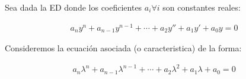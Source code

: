 Sea dada la ED donde los coeficientes \(\displaystyle a_{i}\forall i\) son constantes reales:

\begin{equation*}
    \begin{gathered}
        a_{n}y^{n}+a_{n-1}y^{n-1}+\cdots+a_{2}y''+a_{1}y'+a_{0}y=0
    \end{gathered}
\end{equation*}

Consideremos la ecuación asociada (o caracteristica) de la forma:

\begin{equation*}
    \begin{gathered}
        a_{n}\lambda^{n}+a_{n-1}\lambda^{n-1}+\cdots+a_{2}\lambda^{2}+a_{1}\lambda+a_{0}=0
    \end{gathered}
\end{equation*}

